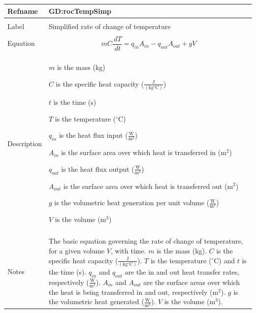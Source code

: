 \documentclass[12pt]{article}
\begin{document}
\noindent \begin{minipage}{\textwidth}
\begin{tabular}{>{\raggedright}p{}>{\raggedright\arraybackslash}p{}}
\toprule \textbf{Refname} & \textbf{GD:rocTempSimp}
\label{GD:rocTempSimp}
\\ \midrule \\
Label & Simplified rate of change of temperature
\\ \midrule \\
Equation & \begin{displaymath}
           m C \frac{\,dT}{\,dt}={q_{in}} {A_{in}}-{q_{out}} {A_{out}}+g V
           \end{displaymath}
\\ \midrule \\
Description & \begin{symbDescription}
              \item{$m$ is the mass (kg)}
              \item{$C$ is the specific heat capacity ($\frac{\text{J}}{(\text{kg}{}^{\circ}\text{C})}$)}
              \item{$t$ is the time (s)}
              \item{$T$ is the temperature (${}^{\circ}$C)}
              \item{${q_{in}}$ is the heat flux input ($\frac{\text{W}}{\text{m}^{2}}$)}
              \item{${A_{in}}$ is the surface area over which heat is transferred in ($\text{m}^{2}$)}
              \item{${q_{out}}$ is the heat flux output ($\frac{\text{W}}{\text{m}^{2}}$)}
              \item{${A_{out}}$ is the surface area over which heat is transferred out ($\text{m}^{2}$)}
              \item{$g$ is the volumetric heat generation per unit volume ($\frac{\text{W}}{\text{m}^{3}}$)}
              \item{$V$ is the volume ($\text{m}^{3}$)}
              \end{symbDescription}
\\ \midrule \\
Notes & The basic equation governing the rate of change of temperature, for a given volume $V$, with time. $m$ is the mass (kg). $C$ is the specific heat capacity ($\frac{\text{J}}{(\text{kg}{}^{\circ}\text{C})}$). $T$ is the temperature (${}^{\circ}$C) and $t$ is the time (s). ${q_{in}}$ and ${q_{out}}$ are the in and out heat transfer rates, respectively ($\frac{\text{W}}{\text{m}^{2}}$). ${A_{in}}$ and ${A_{out}}$ are the surface areas over which the heat is being transferred in and out, respectively ($\text{m}^{2}$). $g$ is the volumetric heat generated ($\frac{\text{W}}{\text{m}^{3}}$). $V$ is the volume ($\text{m}^{3}$).

\end{tabular}
\end{minipage}
\end{document}
